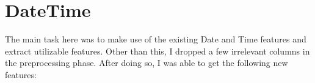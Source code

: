 


\section{DateTime}

The main task here was to make use of the existing Date and Time features and extract utilizable features. Other than this, I dropped a few irrelevant columns in the preprocessing phase. After doing so, I was able to get the following new features:


